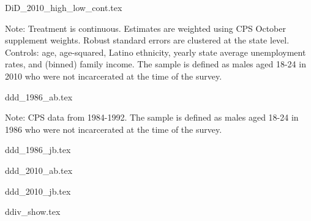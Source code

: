 {DiD_2010_high_low_cont.tex}
\begin{footnotesize}
  \noindent Note: Treatment is continuous. Estimates are weighted using CPS October supplement weights. Robust standard errors are clustered at the state level. Controls: age, age-squared, Latino ethnicity, yearly state average unemployment rates, and (binned) family income. The sample is defined as males aged 18-24 in 2010 who were not incarcerated at the time of the survey.
\end{footnotesize}
\clearpage

{ddd_1986_ab.tex}
\begin{footnotesize}
  \noindent Note: CPS data from 1984-1992.
  The sample is defined as males aged 18-24 in 1986 who were not incarcerated at the time of the survey.
\end{footnotesize}

\clearpage

{ddd_1986_jb.tex}

\clearpage

{ddd_2010_ab.tex}

\clearpage

{ddd_2010_jb.tex}

{ddiv_show.tex}

